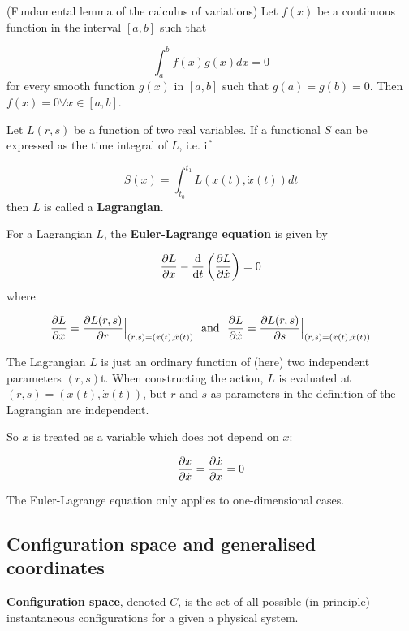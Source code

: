 \begin{lemma}
	(Fundamental lemma of the calculus of variations) Let $f(x)$ be a continuous function in the interval $[a, b]$ such that

	\[ \int_a^b f(x) g(x) dx = 0 \]
	for every smooth function $g(x)$ in $[a, b]$ such that $g(a) = g(b) = 0$. Then $f(x) = 0 \forall x \in [a, b]$.
\end{lemma}

\begin{definition}
	Let $L(r, s)$ be a function of two real variables. If a functional $S$ can be expressed as the time integral of $L$, i.e. if

	\[ S(x) = \int_{t_0}^{t_1} L(x(t), \dot{x}(t)) dt \]
	then $L$ is called a \textbf{Lagrangian}.
\end{definition}

\begin{definition}
	For a Lagrangian $L$, the \textbf{Euler-Lagrange equation} is given by

	\[ \diffp{L}{x} - \diff{}{t} \left( \diffp{L}{\dot{x}} \right) = 0 \]
	where

	\[ \diffp{L}{x} = \diffp{L(r, s)}{r} \Big|_{(r, s) = (x(t), \dot{x}(t))} \text{ \ and \ } \diffp{L}{\dot{x}} = \diffp{L(r, s)}{s} \Big|_{(r, s) = (x(t), \dot{x}(t))} \]
\end{definition}

\begin{remark}\label{rem:lagrangianParametersIndependent}
	The Lagrangian $L$ is just an ordinary function of (here) two independent parameters $(r, s)$t. When constructing the action, $L$ is evaluated at $(r, s) = (x(t), \dot{x}(t))$, but $r$ and $s$ as parameters in the definition of the Lagrangian are independent.

	So $\dot{x}$ is treated as a variable which does not depend on $x$:

	\[ \diffp{x}{\dot{x}} = \diffp{\dot{x}}{x} = 0 \]
\end{remark}

\begin{remark}
	The Euler-Lagrange equation only applies to one-dimensional cases.
\end{remark}

\subsection{Configuration space and generalised coordinates}

\begin{definition}
	\textbf{Configuration space}, denoted $C$, is the set of all possible (in principle) instantaneous configurations for a given a physical system.
\end{definition}

